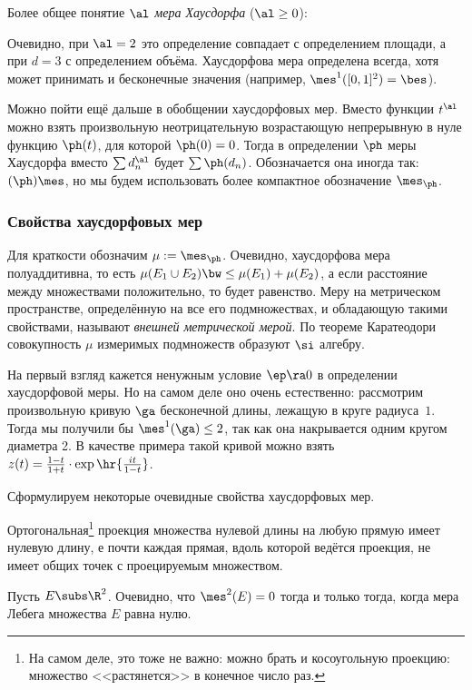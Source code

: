 \documentclass[a4paper]{article}
\begin{document}
\begin{df}
Более общее понятие \emph{$\al$ мера Хаусдорфа} ($\al \ge 0$):
\end{df}

Очевидно, при $\al=2$ это определение совпадает с определением площади, а при $d=3$ с определением объёма.
Хаусдорфова мера определена всегда, хотя может принимать и бесконечные значения (например, $\mes^1([0,1]^2)=\bes$).

Можно пойти ещё дальше в обобщении хаусдорфовых мер. Вместо функции $t^\al$ можно взять произвольную
неотрицательную возрастающую непрерывную в нуле функцию $\ph(t)$, для которой $\ph(0)=0$.
Тогда в определении $\ph$ меры Хаусдорфа вместо $\sum d_n^\al$ будет $\sum \ph(d_n)$.
Обозначается она иногда так: $(\ph)\mes$, но мы будем использовать более компактное обозначение $\mes_\ph$.


\subsubsection{Свойства хаусдорфовых мер}

Для краткости  обозначим $\mu := \mes_\ph$. Очевидно, хаусдорфова мера полуаддитивна, то есть
$\mu(E_1\cup E_2) \bw\le \mu(E_1) +\mu(E_2)$, а если расстояние между множествами положительно, то будет равенство.
Меру на метрическом пространстве, определённую на все его подмножествах, и обладающую такими свойствами, называют
\emph{внешней метрической мерой}. По теореме Каратеодори совокупность $\mu$ измеримых подмножеств
образуют $\si$ алгебру.

На первый взгляд кажется ненужным условие $\ep\ra0$ в определении хаусдорфовой меры. Но на самом деле оно
очень естественно: рассмотрим произвольную кривую $\ga$ бесконечной длины, лежащую в круге радиуса~$1$.
Тогда мы получили бы $\mes^1(\ga)\le 2$, так как она накрывается одним кругом диаметра 2.
В качестве примера такой кривой можно взять $z(t) = \frac{1-t}{1+t}\cdot\exp\hr{\frac{it}{1-t}}$.


Сформулируем некоторые очевидные свойства хаусдорфовых мер.

\begin{points}{-1}
\item Ортогональная\footnote{На самом деле, это тоже не важно: можно брать и косоугольную проекцию: множество <<растянется>>
в конечное число раз.} проекция множества нулевой длины на любую прямую имеет нулевую длину, е
почти каждая прямая, вдоль которой ведётся проекция, не имеет общих точек с проецируемым множеством.
\item
Пусть $E\subs \R^2$. Очевидно, что $\mes^2(E)=0$ тогда и только тогда, когда мера Лебега множества $E$ равна нулю.
\end{points}
\end{document}
